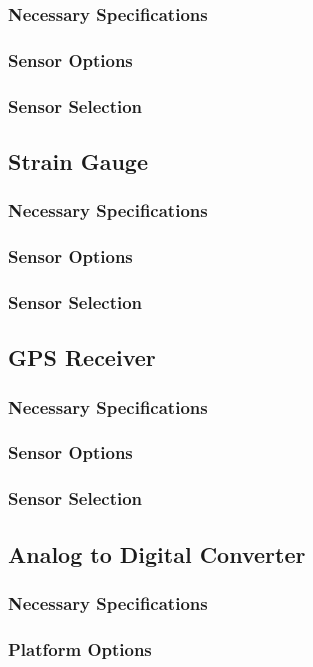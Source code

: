 \documentclass[twoside,11pt]{report}
\begin{document}
			\subsubsection{Necessary Specifications}
			\subsubsection{Sensor Options}
			\subsubsection{Sensor Selection}
		\subsection{Strain Gauge}
			\subsubsection{Necessary Specifications}
			\subsubsection{Sensor Options}
			\subsubsection{Sensor Selection}
		\subsection{GPS Receiver}			
			\subsubsection{Necessary Specifications}
			\subsubsection{Sensor Options}
			\subsubsection{Sensor Selection}
		\subsection{Analog to Digital Converter}
			\subsubsection{Necessary Specifications}					
			\subsubsection{Platform Options}
\end{document}
